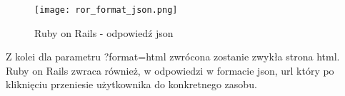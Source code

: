 		\begin{figure}[H]
			\begin{center}
				\texttt{[image: ror\_format\_json.png]}
				\caption{\label{fig:ror-json} Ruby on Rails - odpowiedź json}
			\end{center}
		\end{figure}
	
		
		\noindent Z kolei dla parametru ?format=html zwrócona zostanie zwykła strona html. \\
		
		\noindent Ruby on Rails zwraca również, w odpowiedzi w formacie json, url który po kliknięciu przeniesie użytkownika do konkretnego zasobu.
	
	
	

